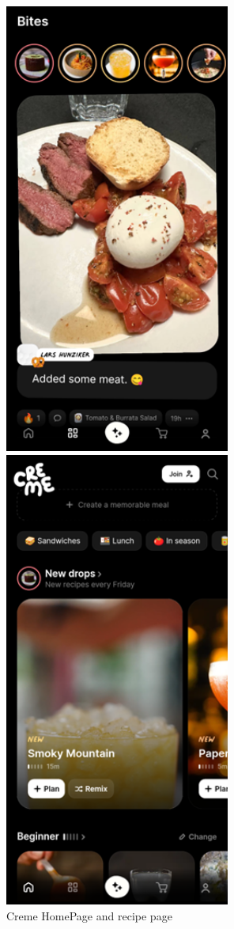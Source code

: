 \documentclass[]{project_final}
\begin{document}
\begin{figure}[ht!]
    \centering
    \begin{minipage}[t]{0.4\textwidth}
        \includegraphics[width=20em]{cremeImage1.png}
    \end{minipage}
    \hfill
    \begin{minipage}[t]{0.4\textwidth}
        \includegraphics[width=20em]{cremeImage2.png}
    \end{minipage}
    \caption{Creme HomePage and recipe page}
    \label{fig:1}
\end{figure}
\end{document}

